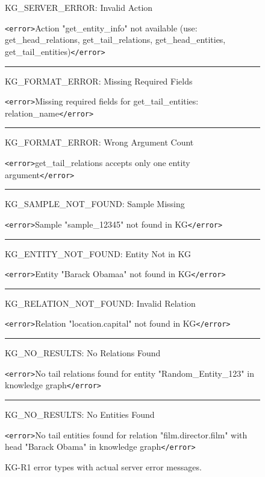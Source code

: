 \begin{figure}[h]
\centering
\begin{reasonbox}[title=KG-R1 Server Error Examples]
\setlength{\parskip}{0.3em}
\setlength{\parindent}{0pt}
\raggedright
\small
KG\_SERVER\_ERROR: Invalid Action

\texttt{<error>}Action "get\_entity\_info" not available (use: get\_head\_relations, get\_tail\_relations, get\_head\_entities, get\_tail\_entities)\texttt{</error>}

\vspace{0.25em}\hrule\vspace{0.25em}

KG\_FORMAT\_ERROR: Missing Required Fields

\texttt{<error>}Missing required fields for get\_tail\_entities: relation\_name\texttt{</error>}

\vspace{0.25em}\hrule\vspace{0.25em}

KG\_FORMAT\_ERROR: Wrong Argument Count

\texttt{<error>}get\_tail\_relations accepts only one entity argument\texttt{</error>}

\vspace{0.25em}\hrule\vspace{0.25em}

KG\_SAMPLE\_NOT\_FOUND: Sample Missing

\texttt{<error>}Sample "sample\_12345" not found in KG\texttt{</error>}

\vspace{0.25em}\hrule\vspace{0.25em}

KG\_ENTITY\_NOT\_FOUND: Entity Not in KG

\texttt{<error>}Entity "Barack Obamaa" not found in KG\texttt{</error>}

\vspace{0.25em}\hrule\vspace{0.25em}

KG\_RELATION\_NOT\_FOUND: Invalid Relation

\texttt{<error>}Relation "location.capital" not found in KG\texttt{</error>}

\vspace{0.25em}\hrule\vspace{0.25em}

KG\_NO\_RESULTS: No Relations Found

\texttt{<error>}No tail relations found for entity "Random\_Entity\_123" in knowledge graph\texttt{</error>}

\vspace{0.25em}\hrule\vspace{0.25em}

KG\_NO\_RESULTS: No Entities Found

\texttt{<error>}No tail entities found for relation "film.director.film" with head "Barack Obama" in knowledge graph\texttt{</error>}

\end{reasonbox}
\caption{KG-R1 error types with actual server error messages.}
\end{figure}
